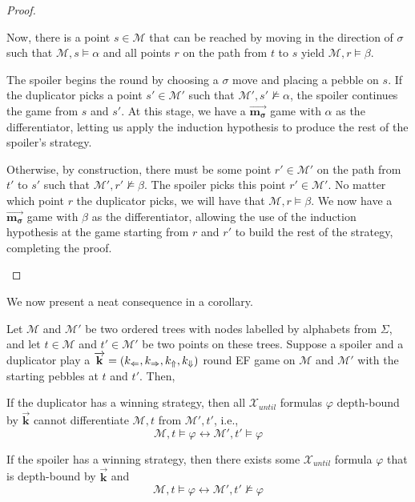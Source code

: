 \documentclass[a4paper,UKenglish,cleveref, autoref, thm-restate, numberwithinsect]{lipics-v2021}
\def\Larrow{\ensuremath\mathord{\Leftarrow}}
\def\Rarrow{\ensuremath\mathord{\Rightarrow}}
\def\Uarrow{\ensuremath\mathord{\Uparrow}}
\def\Darrow{\ensuremath\mathord{\Downarrow}}
\newcommand{\myvec}[1]{\overrightarrow{\mathbf{#1}}}
\begin{document}
\begin{proof}
\begin{description}
            Now, there is a point $s \in \mathcal{M}$ that can be reached by moving in the direction of $\sigma$ such that $\mathcal{M}, s \vDash \alpha$ and all points $r$ on the path from $t$ to $s$ yield $\mathcal{M}, r \vDash \beta$.

            The spoiler begins the round by choosing a $\sigma$ move and placing a pebble on $s$. If the duplicator picks a point $s' \in \mathcal{M}'$ such that $\mathcal{M}', s' \nvDash \alpha$, the spoiler continues the game from $s$ and $s'$. At this stage, we have a $\myvec{m_\sigma}$ game with $\alpha$ as the differentiator, letting us apply the induction hypothesis to produce the rest of the spoiler's strategy.

            Otherwise, by construction, there must be some point $r' \in \mathcal{M}'$ on the path from $t'$ to $s'$ such that $\mathcal{M}', r' \nvDash \beta$. The spoiler picks this point $r' \in \mathcal{M}'$. No matter which point $r$ the duplicator picks, we will have that $\mathcal{M}, r \vDash \beta$. We now have a $\myvec{m_\sigma}$ game with $\beta$ as the differentiator, allowing the use of the induction hypothesis at the game starting from $r$ and $r'$ to build the rest of the strategy, completing the proof.
    \end{description}
\end{proof}
We now present a neat consequence in a corollary.
\begin{corollary}
    \label{corollary:ef-games-working-principle}
    Let $\mathcal{M}$ and $\mathcal{M}'$ be two ordered trees with nodes labelled by alphabets from $\Sigma$, and let $t \in \mathcal{M}$ and $t' \in \mathcal{M}'$ be two points on these trees. Suppose a spoiler and a duplicator play a $\myvec{k} = (k_{\Larrow}, k_{\Rarrow}, k_{\Uarrow}, k_{\Darrow})$ round EF game on $\mathcal{M}$ and $\mathcal{M}'$ with the starting pebbles at $t$ and $t'$. Then,

    \begin{bracketenumerate}
        \item If the duplicator has a winning strategy, then all $\mathcal{X}_{until}$ formulas $\varphi$ depth-bound by $\myvec{k}$ cannot differentiate $\mathcal{M}, t$ from $\mathcal{M}', t'$, i.e.,
            \begin{equation*}
                \mathcal{M}, t \vDash \varphi \longleftrightarrow \mathcal{M}', t' \vDash \varphi
            \end{equation*}

        \item If the spoiler has a winning strategy, then there exists some $\mathcal{X}_{until}$ formula $\varphi$ that is depth-bound by $\myvec{k}$ and
            \begin{equation*}
                \mathcal{M}, t \vDash \varphi \longleftrightarrow \mathcal{M}', t' \nvDash \varphi
            \end{equation*}
    \end{bracketenumerate}
\end{corollary}
\end{document}
